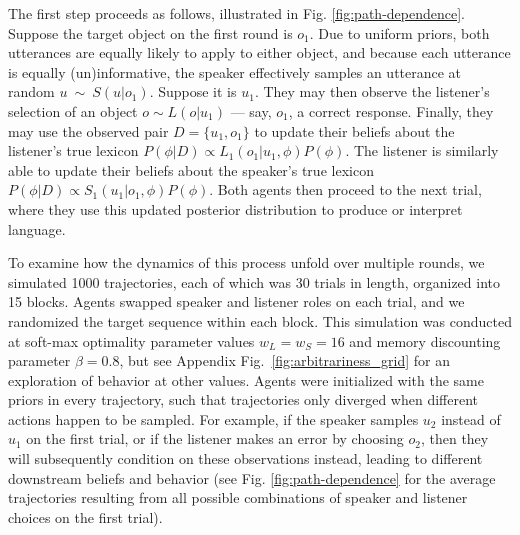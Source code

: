 The first step proceeds as follows, illustrated in Fig. \ref{fig:path-dependence}.
Suppose the target object on the first round is $o_1$.
Due to uniform priors, both utterances are equally likely to apply to either object, and because each utterance is equally (un)informative, the speaker effectively samples an utterance at random $u~\sim~S(u|o_1)$.
Suppose it is $u_1$.
They may then observe the listener's selection of an object $o \sim L(o | u_1)$ --- say, $o_1$, a correct response.
Finally, they may use the observed pair $D = \{u_1, o_1\}$ to update their beliefs about the listener's true lexicon $P(\phi | D)\propto L_1(o_1 | u_1, \phi)P(\phi)$.
The listener is similarly able to update their beliefs about the speaker's true lexicon $P(\phi | D)\propto S_1(u_1 | o_1, \phi)P(\phi)$. 
Both agents then proceed to the next trial, where they use this updated posterior distribution to produce or interpret language.

To examine how the dynamics of this process unfold over multiple rounds, we simulated 1000 trajectories, each of which was 30 trials in length, organized into 15 blocks.
Agents swapped speaker and listener roles on each trial, and we randomized the target sequence within each block.
This simulation was conducted at soft-max optimality parameter values $w_L = w_S = 16$ and memory discounting parameter $\beta = 0.8$, but see Appendix Fig.~\ref{fig:arbitrariness_grid} for an exploration of behavior at other values.
Agents were initialized with the same priors in every trajectory, such that trajectories only diverged when different actions happen to be sampled.
For example, if the speaker samples $u_2$ instead of $u_1$ on the first trial, or if the listener makes an error by choosing $o_2$, then they will subsequently condition on these observations instead, leading to different downstream beliefs and behavior (see Fig. \ref{fig:path-dependence} for the average trajectories resulting from all possible combinations of speaker and listener choices on the first trial).

